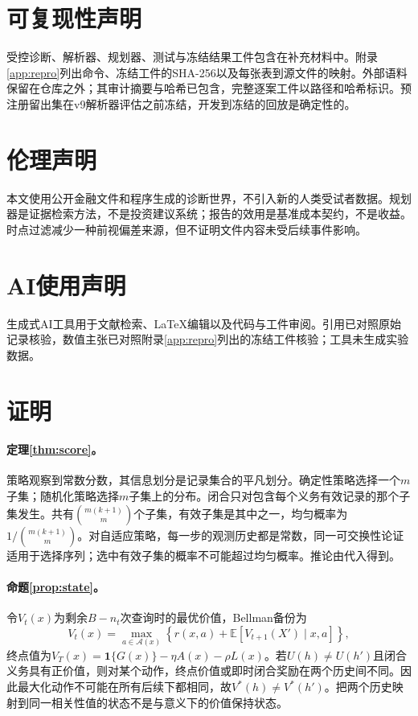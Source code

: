 \documentclass[10.5pt,a4paper]{ctexart}
\newcommand{\E}{\mathbb{E}}
\newcommand{\indic}[1]{\mathbf{1}\{#1\}}
\begin{document}
\section*{可复现性声明}
受控诊断、解析器、规划器、测试与冻结结果工件包含在补充材料中。附录\ref{app:repro}列出命令、冻结工件的SHA-256以及每张表到源文件的映射。外部语料保留在仓库之外；其审计摘要与哈希已包含，完整逐案工件以路径和哈希标识。预注册留出集在v9解析器评估之前冻结，开发到冻结的回放是确定性的。

\section*{伦理声明}
本文使用公开金融文件和程序生成的诊断世界，不引入新的人类受试者数据。规划器是证据检索方法，不是投资建议系统；报告的效用是基准成本契约，不是收益。时点过滤减少一种前视偏差来源，但不证明文件内容未受后续事件影响。

\section*{AI使用声明}
生成式AI工具用于文献检索、LaTeX编辑以及代码与工件审阅。引用已对照原始记录核验，数值主张已对照附录\ref{app:repro}列出的冻结工件核验；工具未生成实验数据。




\appendix
\section{证明}
\label{app:proofs}
\paragraph{定理\ref{thm:score}。}策略观察到常数分数，其信息划分是记录集合的平凡划分。确定性策略选择一个$m$子集；随机化策略选择$m$子集上的分布。闭合只对包含每个义务有效记录的那个子集发生。共有$\binom{m(k+1)}{m}$个子集，有效子集是其中之一，均匀概率为$1/\binom{m(k+1)}{m}$。对自适应策略，每一步的观测历史都是常数，同一可交换性论证适用于选择序列；选中有效子集的概率不可能超过均匀概率。推论由代入得到。

\paragraph{命题\ref{prop:state}。}令$V_t(x)$为剩余$B-n_t$次查询时的最优价值，Bellman备份为
\begin{equation}
V_t(x)=\max_{a\in\mathcal{A}(x)}\left\{r(x,a)+\E[V_{t+1}(X')\mid x,a]\right\},
\end{equation}
终点值为$V_T(x)=\indic{G(x)}-\eta A(x)-\rho L(x)$。若$U(h)\neq U(h')$且闭合义务具有正价值，则对某个动作，终点价值或即时闭合奖励在两个历史间不同。因此最大化动作不可能在所有后续下都相同，故$V^*(h)\neq V^*(h')$。把两个历史映射到同一相关性值的状态不是\citet{li2006abstraction}与\citet{abel2020abstraction}意义下的价值保持状态。
\end{document}
